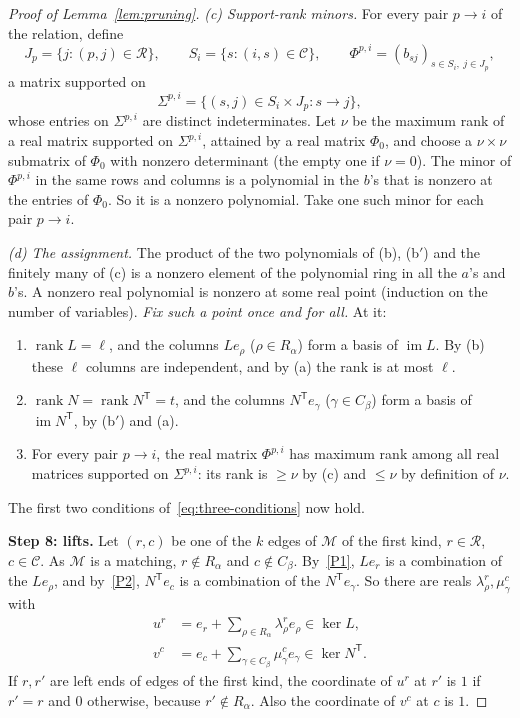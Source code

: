 \documentclass[11pt]{article}
\theoremstyle{remark}
\DeclareMathOperator{\rank}{rank}
\DeclareMathOperator{\im}{im}
\newcommand{\step}[1]{\par\medskip\noindent\textbf{#1}\enspace}
\begin{document}
\begin{proof}[Proof of Lemma~\ref{lem:pruning}]
\emph{(c) Support-rank minors.}
For every pair $p\to i$ of the relation, define
\[
 J_p=\{j:(p,j)\in\mathcal R\},\qquad
 S_i=\{s:(i,s)\in\mathcal C\},\qquad
 \Phi^{p,i}=(b_{sj})_{s\in S_i,\ j\in J_p},
\]
a matrix supported on
\[
 \Sigma^{p,i}=\{(s,j)\in S_i\times J_p:s\to j\},
\]
whose entries on $\Sigma^{p,i}$ are distinct indeterminates.
Let $\nu$ be the maximum rank of a real matrix supported on $\Sigma^{p,i}$,
attained by a real matrix $\Phi_0$, and choose a $\nu\times\nu$ submatrix of
$\Phi_0$ with nonzero determinant (the empty one if $\nu=0$).
The minor of $\Phi^{p,i}$ in the same rows and columns is a polynomial in the
$b$'s that is nonzero at the entries of $\Phi_0$.  So it is a nonzero
polynomial.  Take one such minor for each pair $p\to i$.

\emph{(d) The assignment.}
The product of the two polynomials of (b), (b$'$) and the finitely many of
(c) is a nonzero element of the polynomial ring in all the $a$'s and $b$'s.
A nonzero real polynomial is nonzero at some real point (induction on the
number of variables).  \emph{Fix such a point once and for all.}  At it:
\begin{enumerate}[label=\textup{(P\arabic*)},nosep,leftmargin=3em]
\item\label{P1} $\rank L=\ell$, and the columns $Le_\rho$
 ($\rho\in R_\alpha$) form a basis of $\im L$.  By (b) these $\ell$
 columns are independent, and by (a) the rank is at most $\ell$.
\item\label{P2} $\rank N=\rank N^{\mathsf T}=t$, and the columns
 $N^{\mathsf T}e_\gamma$ ($\gamma\in C_\beta$) form a basis of
 $\im N^{\mathsf T}$, by (b$'$) and (a).
\item\label{P3} For every pair $p\to i$, the real matrix $\Phi^{p,i}$ has
 maximum rank among all real matrices supported on $\Sigma^{p,i}$: its rank
 is $\ge\nu$ by (c) and $\le\nu$ by definition of $\nu$.
\end{enumerate}
The first two conditions of~\eqref{eq:three-conditions} now hold.

\step{Step 8: lifts.}
Let $(r,c)$ be one of the $k$ edges of $\mathcal M$ of the first kind,
$r\in\mathcal R$, $c\in\mathcal C$.  As $\mathcal M$ is a matching,
$r\notin R_\alpha$ and $c\notin C_\beta$.  By~\ref{P1},
$Le_r$ is a combination of the $Le_\rho$, and by~\ref{P2},
$N^{\mathsf T}e_c$ is a combination of the $N^{\mathsf T}e_\gamma$.
So there are reals $\lambda^r_\rho,\mu^c_\gamma$ with
\begin{equation}\label{eq:pruning-lifts}
 \begin{aligned}
 u^r&=e_r+\sum_{\rho\in R_\alpha}\lambda_\rho^r e_\rho
                 \in\ker L,\\
 v^c&=e_c+\sum_{\gamma\in C_\beta}\mu_\gamma^c e_\gamma
                 \in\ker N^{\mathsf T}.
 \end{aligned}
\end{equation}
If $r,r'$ are left ends of edges of the first kind, the coordinate of $u^r$
at $r'$ is $1$ if $r'=r$ and $0$ otherwise, because $r'\notin R_\alpha$.
Also the coordinate of $v^c$ at $c$ is $1$.


\end{proof}
\end{document}
